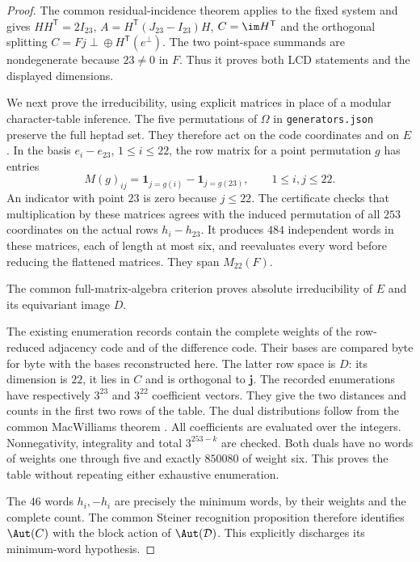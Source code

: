\begin{proof}
The common residual-incidence theorem \cite[Theorem~2.2]{U} applies to the fixed system and gives $HH^{\mathsf T}=2I_{23}$,
$A=H^{\mathsf T}(J_{23}-I_{23})H$, $C=\im H^{\mathsf T}$ and the
orthogonal splitting $C=Fj\perp\!\oplus H^{\mathsf T}(e^\perp)$.
The two point-space summands are nondegenerate because $23\ne0$ in $F$.
Thus it proves both LCD statements and the displayed dimensions.

We next prove the irreducibility, using explicit matrices in place of a
modular character-table inference. The five permutations of $\Omega$
in \texttt{generators.json} preserve the full heptad set. They therefore
act on the code coordinates and on $E$. In the basis
$e_i-e_{23}$, $1\leq i\leq22$, the row matrix for a point permutation
$g$ has entries
\[
 M(g)_{ij}=\mathbf1_{j=g(i)}-\mathbf1_{j=g(23)},\qquad 1\leq i,j\leq22.
\]
An indicator with point $23$ is zero because $j\leq22$.
The certificate checks that multiplication by these matrices agrees
with the induced permutation of all $253$ coordinates on the actual
rows $h_i-h_{23}$. It produces $484$ independent words in these matrices,
each of length at most six, and reevaluates every word before reducing
the flattened matrices. They span $M_{22}(F)$.

The common full-matrix-algebra criterion \cite[Theorem~6.2]{U} proves absolute irreducibility of $E$ and its equivariant image $D$.

The existing enumeration records contain the complete weights of the
row-reduced adjacency code and of the difference code. Their bases are
compared byte for byte with the bases reconstructed here. The latter
row space is $D$: its dimension is $22$, it lies in $C$ and is orthogonal
to $\mathbf j$. The recorded enumerations have respectively $3^{23}$
and $3^{22}$ coefficient vectors. They give the two distances and counts
in the first two rows of the table. The dual distributions follow from the common MacWilliams theorem \cite[Theorem~7.1]{U}.
All coefficients are evaluated over the integers. Nonnegativity,
integrality and total $3^{253-k}$ are checked. Both duals have no words
of weights one through five and exactly $850080$ of weight six.
This proves the table without repeating either exhaustive enumeration.

The $46$ words $h_i,-h_i$ are precisely the minimum words, by their weights and the complete count. The common Steiner recognition proposition \cite[Proposition~2.3]{U} therefore identifies $\Aut(C)$ with the block action of $\Aut(\mathcal D)$. This explicitly discharges its minimum-word hypothesis.


\end{proof}
